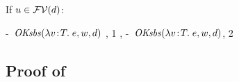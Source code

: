 \begin{bycase}
If $u\in\mathcal{FV}(d)$:
\begin{derivatioN}{2}
\step{\efvar{\exprI}\cap\cvarv{\absO}{\varII}=\emptyset}
     {\hyp\ $\mathit{OKsbs}(\lambda v\!:\!T.\;e,w,d)$}
\step{\cvarv{\absO}{\varII}=\setI{\var}\cup\cvarv{\expr}{\varII}}
     {, 1}
\step{\esbsok{\expr}{\varII}{\exprI}}
     {, \hyp\ $\mathit{OKsbs}(\lambda v\!:\!T.\;e,w,d)$, 2}
\steP
{\esbsren{\esbs{(\absO)}{\varII}{\exprI}}
 \abs{\var}{\typ}{\esbsren{\esbs{\expr}{\varII}{\exprI}}}
 \abs{\var}{\typ}{\esbsren{\esbs{\expr}{\varII}{\esbsren{\exprI}}}}
 \esbsren{\esbs{(\absO)}{\varII}{\esbsren{\exprI}}}}
\end{derivatioN}

\end{bycase}



\subsection*{Proof of }

